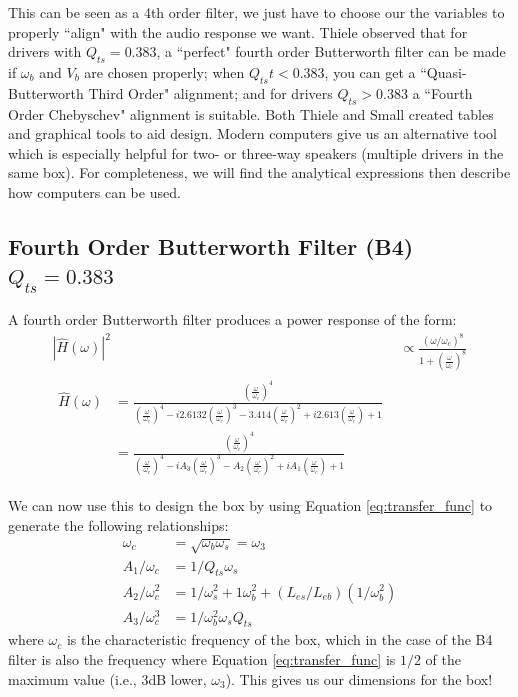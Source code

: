 \documentclass[10pt]{book}
\begin{document}

This can be seen as a 4th order filter, we just have to choose our the variables to properly ``align" with the audio response we want. Thiele observed that for drivers with $Q_{ts}=0.383$, a ``perfect" fourth order Butterworth filter can be made if $\omega_b$ and $V_b$ are chosen properly; when $Q_{ts}t<0.383$, you can get a ``Quasi-Butterworth Third Order" alignment; and for drivers $Q_{ts}>0.383$ a ``Fourth Order Chebyschev" alignment is suitable. Both Thiele and Small created tables and graphical tools to aid design. Modern computers give us an alternative tool which is especially helpful for two- or three-way speakers (multiple drivers in the same box). For completeness, we will find the analytical expressions then describe how computers can be used.

\subsection{Fourth Order Butterworth Filter (B4) \texorpdfstring{\\$Q_{ts}=0.383$}{Qts=0.383}} A fourth order Butterworth filter produces a power response of the form:
\begin{align}
\left|  \hat{H}(\omega) \right|^2&\propto \frac{(\omega/\omega_c)^8}{1+\left(\frac{\omega}{\omega_c}\right)^8}\label{eq:transfer_func}\\
\begin{split}
\hat{H}(\omega)&=\frac{(\frac{\omega}{\omega_c})^4}{(\frac{\omega}{\omega_c})^4-i2.6132(\frac{\omega}{\omega_c})^3-3.414(\frac{\omega}{\omega_c})^2+i2.613(\frac{\omega}{\omega_c})+1}\\
&=\frac{(\frac{\omega}{\omega_c})^4}{(\frac{\omega}{\omega_c})^4-iA_3(\frac{\omega}{\omega_c})^3-A_2(\frac{\omega}{\omega_c})^2+iA_1(\frac{\omega}{\omega_c})+1}
\end{split}
\end{align}

We can now use this to design the box by using Equation \ref{eq:transfer_func} to generate the following relationships:
\begin{align}
\omega_c&=\sqrt{\omega_b \omega_s}=\omega_3\\
A_1/\omega_c&=1/Q_{ts}\omega_s\\
A_2/\omega_c^2&=1/\omega_s^2+1\omega_b^2+(L_{es}/L_{eb})(1/\omega_b^2)\\
A_3/\omega_c^3&=1/\omega_b^2\omega_sQ_{ts}
\end{align}
where $\omega_c$ is the characteristic frequency of the box, which in the case of the B4 filter is also the frequency where Equation \ref{eq:transfer_func} is $1/2$ of the maximum value (i.e., 3dB lower, $\omega_3$). This gives us our dimensions for the box!
\end{document}
